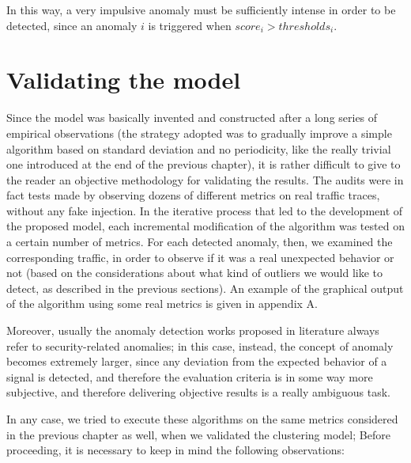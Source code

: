 \documentclass[12pt,a4paper,cucitura]{toptesi}
\begin{document}
In this way, a very impulsive anomaly must be sufficiently intense in order to be detected, since an anomaly $i$ is triggered when $score_i > thresholds_i$.

\section{Validating the model}

Since the model was basically invented and constructed after a long series of empirical observations (the strategy adopted was to gradually improve a simple algorithm based on standard deviation and no periodicity, like the really trivial one introduced at the end of the previous chapter), it is rather difficult to give to the reader an objective methodology for validating the results.
The audits were in fact tests made by observing dozens of different metrics on real traffic traces, without any fake injection.
In the iterative process that led to the development of the proposed model, each incremental modification of the algorithm was tested on a certain number of metrics. For each detected anomaly, then, we examined the corresponding traffic, in order to observe if it was a real unexpected behavior or not (based on the considerations about what kind of outliers we would like to detect, as described in the previous sections). An example of the graphical output of the algorithm using some real metrics is given in appendix A.

Moreover, usually the anomaly detection works proposed in literature always refer to security-related anomalies; in this case, instead, the concept of anomaly becomes extremely larger, since any deviation from the expected behavior of a signal is detected, and therefore the evaluation criteria is in some way more subjective, and therefore delivering objective results is a really ambiguous task.

In any case, we tried to execute these algorithms on the same metrics considered in the previous chapter as well, when we validated the clustering model; Before proceeding, it is necessary to keep in mind the following observations:
\end{document}
